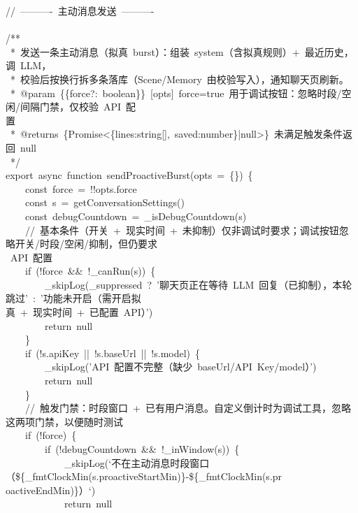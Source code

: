 \documentclass[a4paper,10pt]{article}
\begin{document}
{\ttfamily\footnotesize\raggedright
//~----------~主动消息发送~----------\\
\mbox{}\\
/**\\
~*~发送一条主动消息（拟真~burst）：组装~system（含拟真规则）+~最近历史，调~LLM，\\
~*~校验后按换行拆多条落库（Scene/Memory~由校验写入），通知聊天页刷新。\\
~*~@param~\{\{force?:~boolean\}\}~[opts]~force=true~用于调试按钮：忽略时段/空闲/间隔门禁，仅校验~API~配\\
置\\
~*~@returns~\{Promise<\{lines:string[],~saved:number\}|null>\}~未满足触发条件返回~null\\
~*/\\
export~async~function~sendProactiveBurst(opts~=~\{\})~\{\\
~~~~const~force~=~!!opts.force\\
~~~~const~s~=~getConversationSettings()\\
~~~~const~debugCountdown~=~\_isDebugCountdown(s)\\
~~~~//~基本条件（开关~+~现实时间~+~未抑制）仅非调试时要求；调试按钮忽略开关/时段/空闲/抑制，但仍要求\\
~API~配置\\
~~~~if~(!force~\&\&~!\_canRun(s))~\{\\
~~~~~~~~\_skipLog(\_suppressed~?~'聊天页正在等待~LLM~回复（已抑制），本轮跳过'~:~'功能未开启（需开启拟\\
真~+~现实时间~+~已配置~API）')\\
~~~~~~~~return~null\\
~~~~\}\\
~~~~if~(!s.apiKey~||~!s.baseUrl~||~!s.model)~\{\\
~~~~~~~~\_skipLog('API~配置不完整（缺少~baseUrl/API~Key/model）')\\
~~~~~~~~return~null\\
~~~~\}\\
~~~~//~触发门禁：时段窗口~+~已有用户消息。自定义倒计时为调试工具，忽略这两项门禁，以便随时测试\\
~~~~if~(!force)~\{\\
~~~~~~~~if~(!debugCountdown~\&\&~!\_inWindow(s))~\{\\
~~~~~~~~~~~~\_skipLog(`不在主动消息时段窗口（\$\{\_fmtClockMin(s.proactiveStartMin)\}-\$\{\_fmtClockMin(s.pr\\
oactiveEndMin)\}）`)\\
~~~~~~~~~~~~return~null\\
}
\end{document}
